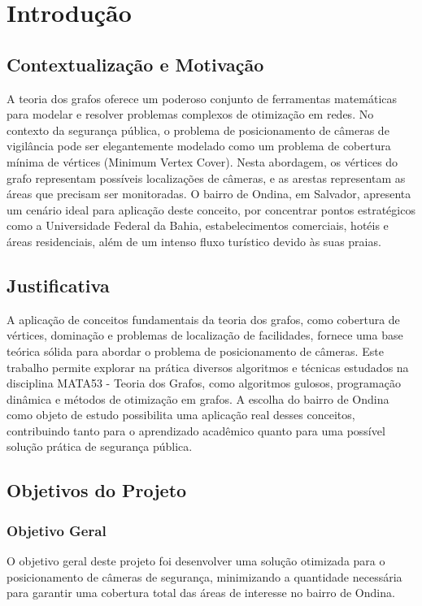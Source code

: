\documentclass[12pt, a4paper]{report}
\begin{document}

\newpage
\tableofcontents
\thispagestyle{empty}
\newpage
\setcounter{page}{1}
\pagestyle{plain}


\chapter{Introdução}

\section{Contextualização e Motivação}
A teoria dos grafos oferece um poderoso conjunto de ferramentas matemáticas para modelar e resolver problemas complexos de otimização em redes. No contexto da segurança pública, o problema de posicionamento de câmeras de vigilância pode ser elegantemente modelado como um problema de cobertura mínima de vértices (Minimum Vertex Cover). Nesta abordagem, os vértices do grafo representam possíveis localizações de câmeras, e as arestas representam as áreas que precisam ser monitoradas. O bairro de Ondina, em Salvador, apresenta um cenário ideal para aplicação deste conceito, por concentrar pontos estratégicos como a Universidade Federal da Bahia, estabelecimentos comerciais, hotéis e áreas residenciais, além de um intenso fluxo turístico devido às suas praias.

\section{Justificativa}
A aplicação de conceitos fundamentais da teoria dos grafos, como cobertura de vértices, dominação e problemas de localização de facilidades, fornece uma base teórica sólida para abordar o problema de posicionamento de câmeras. Este trabalho permite explorar na prática diversos algoritmos e técnicas estudados na disciplina MATA53 - Teoria dos Grafos, como algoritmos gulosos, programação dinâmica e métodos de otimização em grafos. A escolha do bairro de Ondina como objeto de estudo possibilita uma aplicação real desses conceitos, contribuindo tanto para o aprendizado acadêmico quanto para uma possível solução prática de segurança pública.

\section{Objetivos do Projeto}

\subsection{Objetivo Geral}
O objetivo geral deste projeto foi desenvolver uma solução otimizada para o posicionamento de câmeras de segurança, minimizando a quantidade necessária para garantir uma cobertura total das áreas de interesse no bairro de Ondina.
\end{document}
